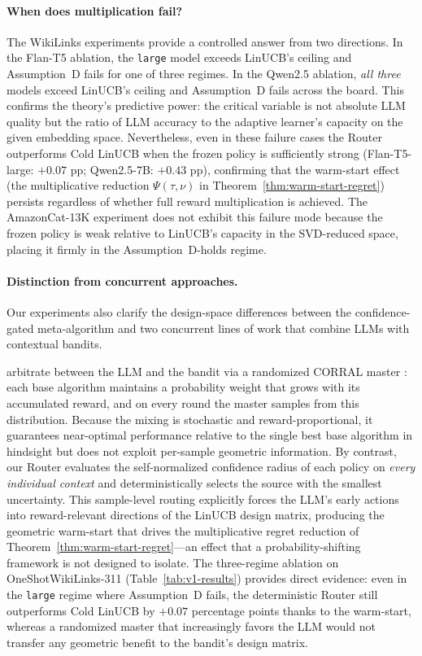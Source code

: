 \paragraph{When does multiplication fail?}
The WikiLinks experiments provide a controlled answer from two directions. In the Flan-T5 ablation, the \texttt{large} model exceeds LinUCB's ceiling and Assumption~D fails for one of three regimes. In the Qwen2.5 ablation, \emph{all three} models exceed LinUCB's ceiling and Assumption~D fails across the board. This confirms the theory's predictive power: the critical variable is not absolute LLM quality but the ratio of LLM accuracy to the adaptive learner's capacity on the given embedding space. Nevertheless, even in these failure cases the Router outperforms Cold LinUCB when the frozen policy is sufficiently strong (Flan-T5-large: $+0.07$ pp; Qwen2.5-7B: $+0.43$ pp), confirming that the warm-start effect (the multiplicative reduction $\Psi(\tau,\nu)$ in Theorem~\ref{thm:warm-start-regret}) persists regardless of whether full reward multiplication is achieved. The AmazonCat-13K experiment does not exhibit this failure mode because the frozen policy is weak relative to LinUCB's capacity in the SVD-reduced space, placing it firmly in the Assumption~D-holds regime.

\paragraph{Distinction from concurrent approaches.}
Our experiments also clarify the design-space differences between the confidence-gated meta-algorithm and two concurrent lines of work that combine LLMs with contextual bandits.

\cite{chen2024llmdecision} arbitrate between the LLM and the bandit via a randomized CORRAL master \cite{agarwal2017corralling}: each base algorithm maintains a probability weight that grows with its accumulated reward, and on every round the master samples from this distribution. Because the mixing is stochastic and reward-proportional, it guarantees near-optimal performance relative to the single best base algorithm in hindsight but does not exploit per-sample geometric information. By contrast, our Router evaluates the self-normalized confidence radius of each policy on \emph{every individual context} and deterministically selects the source with the smallest uncertainty. This sample-level routing explicitly forces the LLM's early actions into reward-relevant directions of the LinUCB design matrix, producing the geometric warm-start that drives the multiplicative regret reduction of Theorem~\ref{thm:warm-start-regret}---an effect that a probability-shifting framework is not designed to isolate. The three-regime ablation on OneShotWikiLinks-311 (Table~\ref{tab:v1-results}) provides direct evidence: even in the \texttt{large} regime where Assumption~D fails, the deterministic Router still outperforms Cold LinUCB by $+0.07$ percentage points thanks to the warm-start, whereas a randomized master that increasingly favors the LLM would not transfer any geometric benefit to the bandit's design matrix.


